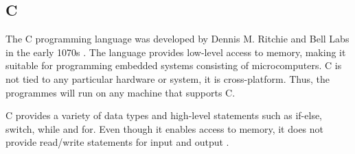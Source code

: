 \subsection{C}
The C programming language was developed by Dennis M. Ritchie and Bell Labs in the early 1070s \cite{clanguage}. The language provides low-level access to memory, making it suitable for programming embedded systems consisting of microcomputers. C is not tied to any particular hardware or system, it is cross-platform. Thus, the programmes will run on any machine that supports C.

C provides a variety of data types and high-level statements such as if-else, switch, while and for. Even though it enables access to memory, it does not provide read/write statements for input and output \cite{cproglang}. 